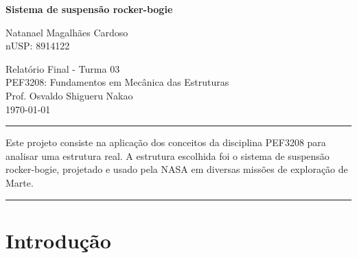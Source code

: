\documentclass[12pt]{article}
\begin{document}
\fancyfoot[C]{\thepage}
\renewcommand{\headrulewidth}{0.4pt}
\renewcommand{\footrulewidth}{0pt}
\pagestyle{fancy}
\thispagestyle{plain}

\begin{center}
  {\LARGE\bfseries Sistema de suspensão rocker-bogie}\\

  \bigskip

  {\large Natanael Magalhães Cardoso}\\
  nUSP: 8914122

  \medbreak

  Relatório Final - Turma 03\\
  PEF3208: Fundamentos em Mecânica das Estruturas\\
  Prof. Osvaldo Shigueru Nakao\\
  \bigskip
  \today
\end{center}

\renewenvironment{abstract}
{\quotation\small\noindent\rule{\linewidth}{.5pt}\par\smallskip
  {\centering\bfseries\abstractname\par}\medskip}
{\par\noindent\rule{\linewidth}{.5pt}\endquotation}

\begin{abstract}
  Este projeto consiste na aplicação dos conceitos da disciplina PEF3208 para analisar uma estrutura real. A estrutura escolhida foi o sistema de suspensão rocker-bogie, projetado e usado pela NASA em diversas missões de exploração de Marte.
\end{abstract}

\section{Introdução}
\end{document}
